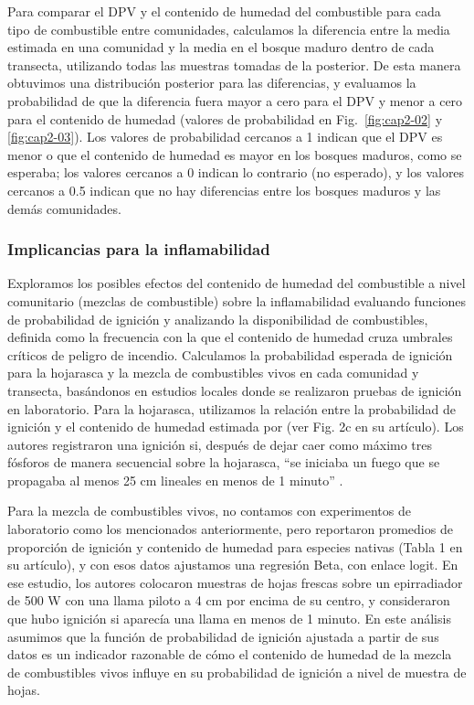 Para comparar el DPV y el contenido de humedad del combustible para cada tipo de combustible entre comunidades, calculamos la diferencia entre la media estimada en una comunidad y la media en el bosque maduro dentro de cada transecta, utilizando todas las muestras tomadas de la posterior. De esta manera obtuvimos una distribución posterior para las diferencias, y evaluamos la probabilidad de que la diferencia fuera mayor a cero para el DPV y menor a cero para el contenido de humedad (valores de probabilidad en Fig.~\ref{fig:cap2-02} y \ref{fig:cap2-03}). Los valores de probabilidad cercanos a 1 indican que el DPV es menor o que el contenido de humedad es mayor en los bosques maduros, como se esperaba; los valores cercanos a 0 indican lo contrario (no esperado), y los valores cercanos a 0.5 indican que no hay diferencias entre los bosques maduros y las demás comunidades.

\subsubsection{Implicancias para la inflamabilidad}

Exploramos los posibles efectos del contenido de humedad del combustible a nivel comunitario (mezclas de combustible) sobre la inflamabilidad evaluando funciones de probabilidad de ignición y analizando la disponibilidad de combustibles, definida como la frecuencia con la que el contenido de humedad cruza umbrales críticos de peligro de incendio. Calculamos la probabilidad esperada de ignición para la hojarasca y la mezcla de combustibles vivos en cada comunidad y transecta, basándonos en estudios locales donde se realizaron pruebas de ignición en laboratorio. Para la hojarasca, utilizamos la relación entre la probabilidad de ignición y el contenido de humedad estimada por \citet{bianchi_ignition_2014} (ver Fig. 2c en su artículo). Los autores registraron una ignición si, después de dejar caer como máximo tres fósforos de manera secuencial sobre la hojarasca, “se iniciaba un fuego que se propagaba al menos 25 cm lineales en menos de 1 minuto” \citep{bianchi_ignition_2014}.

Para la mezcla de combustibles vivos, no contamos con experimentos de laboratorio como los mencionados anteriormente, pero \citet{bianchi_comparison_2018} reportaron promedios de proporción de ignición y contenido de humedad para especies nativas (Tabla 1 en su artículo), y con esos datos ajustamos una regresión Beta, con enlace logit. En ese estudio, los autores colocaron muestras de hojas frescas sobre un epirradiador de 500 W con una llama piloto a 4 cm por encima de su centro, y consideraron que hubo ignición si aparecía una llama en menos de 1 minuto. En este análisis asumimos que la función de probabilidad de ignición ajustada a partir de sus datos es un indicador razonable de cómo el contenido de humedad de la mezcla de combustibles vivos influye en su probabilidad de ignición a nivel de muestra de hojas.

